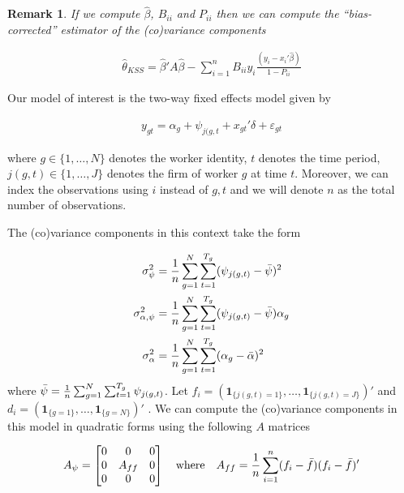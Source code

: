 \documentclass[12pt]{article}
\newtheorem{remark}{Remark}
\begin{document}
\clearpage
\begin{remark}
If we compute $\hat{\beta}$, $B_{ii}$ and $P_{ii}$ then we can compute the ``bias-corrected'' estimator of the (co)variance components

\begin{align*}
    \hat{\theta}_{KSS} =  \hat{\beta}' A \hat{\beta} - \sum_{i=1}^n B_{ii} y_i \frac{(y_i - x_i ' \hat{\beta})}{1-P_{ii}}
\end{align*}
\end{remark}

\vspace{0.5cm}
Our model of interest is the two-way fixed effects model given by

\begin{align*}
y_{gt} = \alpha_{g} + \psi_{j(g,t} + x_{gt}' \delta + \varepsilon_{gt}
\end{align*}


\noindent where $g \in \{1,\dots,N\}$ denotes the worker identity, $t$ denotes the time period, $j(g,t) \in \{1,\dots,J\}$ denotes the firm of worker $g$ at time $t$. Moreover, we can index the observations using $i$ instead of $g,t$ and we will denote $n$ as the total number of observations. 

The (co)variance components in this context take the form 

\begin{align*}
    \sigma_{\psi}^2 &= \frac{1}{n} \sum_{g=1}^{N} \sum_{t=1}^{T_g} (\psi_{j(g,t)} - \Bar{\psi})^2  \\
    \sigma_{\alpha, \psi}^2 &= \frac{1}{n} \sum_{g=1}^{N} \sum_{t=1}^{T_g} (\psi_{j(g,t)} - \Bar{\psi}) \alpha_g  \\
    \sigma_{\alpha}^2 &= \frac{1}{n} \sum_{g=1}^{N} \sum_{t=1}^{T_g} (\alpha_{g} - \Bar{\alpha})^2   \\
\end{align*}
where $\Bar{\psi} = \frac{1}{n} \sum_{g=1}^{N} \sum_{t=1}^{T_g} \psi_{j(g,t)}$. Let $f_i = (\boldsymbol{1}_{\{j(g,t)=1\}},\dots,\boldsymbol{1}_{\{j(g,t)=J\}})'$ and $d_i = (\boldsymbol{1}_{\{g=1\}},\dots,\boldsymbol{1}_{\{g=N\}})'$ . We can compute the (co)variance components in this model in quadratic forms using the following $A$ matrices

\begin{align*}
A_{\psi} = \begin{bmatrix}
0 & 0 & 0\\
0 & A_{ff} & 0\\
0 & 0 & 0
\end{bmatrix} \quad \text{where} \quad A_{ff} = \frac{1}{n} \sum_{i=1}^n (f_i - \Bar{f})(f_i - \Bar{f})'
\end{align*}
\end{document}
